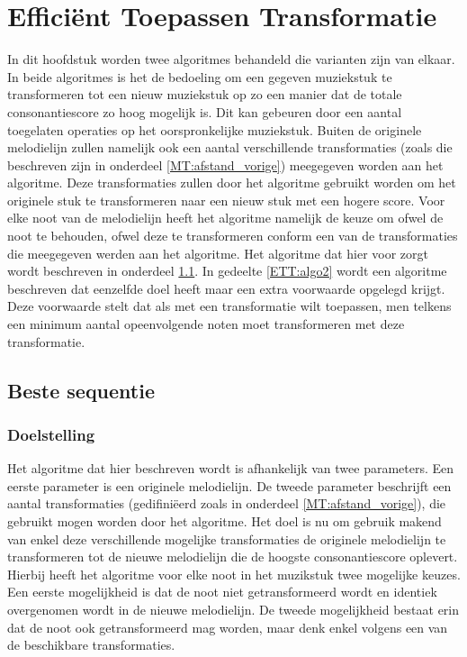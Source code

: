 \chapter{Effici\"ent Toepassen Transformatie}
\label{hoofdstuk:ETT}


In dit hoofdstuk worden twee algoritmes behandeld die varianten zijn van elkaar. In beide algoritmes is het de bedoeling om een gegeven muziekstuk te transformeren tot een nieuw muziekstuk op zo een manier dat de totale consonantiescore zo hoog mogelijk is. Dit kan gebeuren door een aantal toegelaten operaties op het oorspronkelijke muziekstuk. Buiten de originele melodielijn zullen namelijk ook een aantal verschillende transformaties (zoals die beschreven zijn in onderdeel \ref{MT:afstand_vorige}) meegegeven worden aan het algoritme. Deze transformaties zullen door het algoritme gebruikt worden om het originele stuk te transformeren naar een nieuw stuk met een hogere score. Voor elke noot van de melodielijn heeft het algoritme namelijk de keuze om ofwel de noot te behouden, ofwel deze te transformeren conform een van de transformaties die meegegeven werden aan het algoritme. Het algoritme dat hier voor zorgt wordt beschreven in onderdeel \ref{ETT:algo1}. In gedeelte \ref{ETT:algo2} wordt een algoritme beschreven dat eenzelfde doel heeft maar een extra voorwaarde opgelegd krijgt. Deze voorwaarde stelt dat als met een transformatie wilt toepassen, men telkens een minimum aantal opeenvolgende noten moet transformeren met deze transformatie. 

\section{Beste sequentie}
\label{ETT:algo1}

\subsection{Doelstelling}
Het algoritme dat hier beschreven wordt is afhankelijk van twee parameters. Een eerste parameter is een originele melodielijn. De tweede parameter beschrijft een aantal transformaties (gedifini\"eerd zoals in onderdeel \ref{MT:afstand_vorige}), die gebruikt mogen worden door het algoritme. Het doel is nu om gebruik makend van enkel deze verschillende mogelijke transformaties de originele melodielijn te transformeren tot de nieuwe melodielijn die de hoogste consonantiescore oplevert. Hierbij heeft het algoritme voor elke noot in het muzikstuk twee mogelijke keuzes. Een eerste mogelijkheid is dat de noot niet getransformeerd wordt en identiek overgenomen wordt in de nieuwe melodielijn. De tweede mogelijkheid bestaat erin dat de noot ook getransformeerd mag worden, maar denk enkel volgens een van de beschikbare transformaties.

